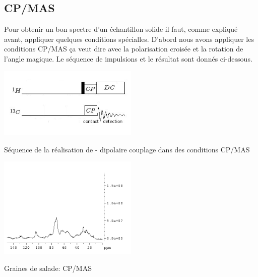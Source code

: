 \documentclass[a4paper,12pt]{scrartcl}
\begin{document}
  \subsection{CP/MAS}
Pour obtenir un bon spectre d'un échantillon solide il faut, comme expliqué avant, appliquer quelques conditions spécialles. D'abord nous avons appliquer les conditions CP/MAS \c ca veut dire avec la polarisation croisée et la rotation de l'angle magique. Le séquence de impulsions et le résultat sont donnés ci-dessous.
 \begin{figurehere}
    \center
     \includegraphics[width=0.5\textwidth]{bilder/PDSD1.png}
     \caption{Séquence de la réalisation de  -  dipolaire couplage dans des conditions CP/MAS}
    \end{figurehere}
 \begin{figurehere}
    \center
    \includegraphics[width=0.5\textwidth]{bilder/graine_solide.png}
    \caption{Graines de salade: CP/MAS}
   \end{figurehere}
\end{document}
